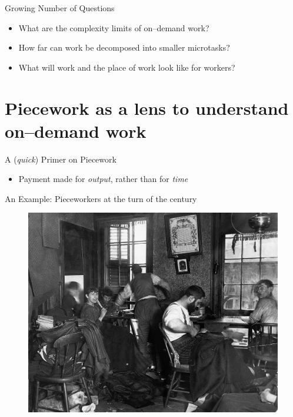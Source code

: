 \documentclass{beamer}
\begin{document}
\begin{frame}{Growing Number of Questions}
\begin{itemize}[<+- | alert@+>]
  \item What are the complexity limits of on--demand work?
  \item How far can work be decomposed into smaller microtasks?
  \item What will work and the place of work look like for workers?
\end{itemize}


\end{frame}


\section{Piecework as a lens to understand on--demand work}


\begin{frame}{A (\textit{quick}) Primer on Piecework}
  \begin{itemize}[<+- | alert@+>]
    \item Payment made for \textit{output}, rather than for \textit{time}
  \end{itemize}
\end{frame}


\begin{frame}{An Example: Pieceworkers at the turn of the  century}
  \begin{figure}
    \includegraphics[scale=0.27]{figures/pieceworkers.jpg}  
  \end{figure}
\end{frame}
\end{document}
